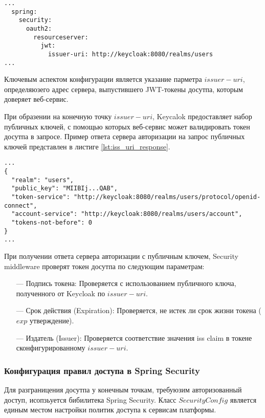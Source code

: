 \begin{lstlisting}[caption={Конфигурация Resource Server}, label=lst:resource_server_config]
...
  spring:
    security:
      oauth2:
        resourceserver:
          jwt:
            issuer-uri: http://keycloak:8080/realms/users
...
\end{lstlisting}

Ключевым аспектом конфигурации является указание парметра $issuer-uri$, определяюзего адрес сервера, выпустившего JWT-токены досутпа, которым доверяет веб-сервис.

При образении на конечную точку $issuer-uri$, Keycalok предоставляет набор публичных ключей, с помощью которых веб-сервис может валидировать токен досутпа в запросе. Пример ответа сервера авторизации на запрос публичных ключей представлен в листиге \ref{lst:iss_uri_response}.

\begin{lstlisting}[caption={Ответ на запрос публичного ключа}, label=lst:iss_uri_response]
...
{
  "realm": "users",
  "public_key": "MIIBIj...QAB",
  "token-service": "http://keycloak:8080/realms/users/protocol/openid-connect",
  "account-service": "http://keycloak:8080/realms/users/account",
  "tokens-not-before": 0
}
...
\end{lstlisting}

При получении ответа сервера авторизации с публичным ключем, Security middleware проверят токен досутпа по следующим параметрам:

\begin{itemize}
\item[---] Подпись токена: Проверяется с использованием публичного ключа, полученного от Keycloak по $issuer-uri$.
\item[---] Срок действия (Expiration): Проверяется, не истек ли срок жизни токена ($exp$ утверждение).
\item[---] Издатель (Issuer): Проверяется соответствие значения iss claim в токене сконфигурированному $issuer-uri$.
\end{itemize}

\subsubsection{Конфигурация правил доступа в Spring Security}

Для разграницения досутпа у конечным точкам, требуюзим авторизованный доступ, исопзьуется бибилитека Spring Security.
Класс $SecurityConfig$ является единым местом настройки политик доступа к сервисам платформы.


